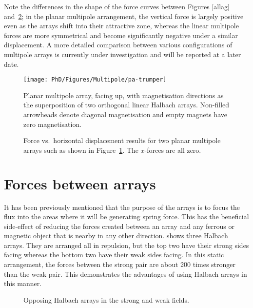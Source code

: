 Note the differences in the shape of the force curves between Figures \ref{allag} and~\ref{trumper}; in the planar multipole arrangement, the vertical force is largely positive even as the arrays shift into their attractive zone, whereas the linear multipole forces are more symmetrical and become significantly negative under a similar displacement. A more detailed comparison between various configurations of multipole arrays is currently under investigation and will be reported at a later date.

\begin{figure}
\centering
\texttt{[image: PhD/Figures/Multipole/pa-trumper]}
\caption{Planar multipole array, facing up, with magnetisation directions as the superposition of two orthogonal linear Halbach arrays. Non-filled arrowheads denote diagonal magnetisation and empty magnets have zero magnetisation.}
\label{trumper-system}
\end{figure}

\begin{figure}
\centering
{}
\caption{Force vs.\ horizontal displacement results for two planar multipole arrays such as shown in Figure~\ref{trumper-system}. The $x$-forces are all zero.}
\label{trumper}
\end{figure}







\section{Forces between arrays}

It has been previously mentioned that the purpose of the arrays is to focus
the flux into the areas where it will be generating spring force. This has the
beneficial side-effect of reducing the forces created between an array and any
ferrous or magnetic object that is nearby in any other direction.
 shows three Halbach arrays. They are arranged all in
repulsion, but the top two have their strong sides facing whereas the bottom
two have their weak sides facing. In this static arrangement, the forces
between the strong pair are about 200 times stronger than the weak pair. This
demonstrates the advantages of using Halbach arrays in this manner.

\begin{figure}[htbp]
   \centering
   \caption{Opposing Halbach arrays in the strong and weak fields.}
\end{figure}

